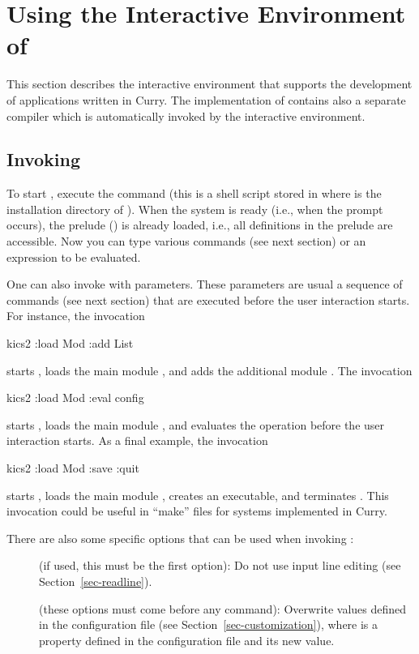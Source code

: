 \section{Using the Interactive Environment of \CYS}
\label{sec-kics2}

This section describes the interactive environment
\CYS\index{\CYS}
that supports the development of applications written in Curry.
The implementation of \CYS contains also a separate compiler
which is automatically invoked by the interactive environment.

\subsection{Invoking \CYS}
\label{sec:invoke-kics2}

To start \CYS, execute the command
(this is a shell script stored in
 where \cyshome is the installation directory
of \CYS).
When the system is ready (i.e., when the prompt  occurs),
the prelude ()
is already loaded, i.e., all definitions in the prelude are accessible.
Now you can type various commands (see next section)
or an expression to be evaluated.

One can also invoke \CYS with parameters.
These parameters are usual a sequence of commands
(see next section) that are executed before the user interaction
starts. For instance, the invocation
\begin{curry}
kics2 :load Mod :add List
\end{curry}
starts \CYS, loads the main module , and adds the additional
module .
The invocation
\begin{curry}
kics2 :load Mod :eval config
\end{curry}
starts \CYS, loads the main module , and evaluates
the operation  before the user interaction starts.
As a final example, the invocation
\begin{curry}
kics2 :load Mod :save :quit
\end{curry}
starts \CYS, loads the main module , creates an executable,
and terminates \CYS. This invocation could be useful in ``make'' files
for systems implemented in Curry.

There are also some specific options that can be used
when invoking \CYS:
\begin{description}
\item[] (if used, this must be the first option):
Do not use input line editing (see Section~\ref{sec-readline}).
\item[]
(these options must come before any \CYS command):
Overwrite values defined in the configuration file 
(see Section~\ref{sec-customization}),
where  is a property defined in the configuration file
and  its new value.
\end{description}


